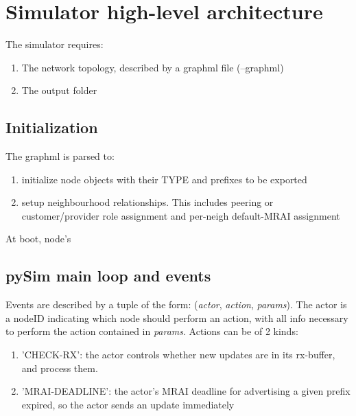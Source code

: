 \documentclass[fleqn,10pt]{SelfArx} %
\begin{document}
\flushbottom %
\maketitle %
\thispagestyle{empty} %

\section{Simulator high-level architecture} 
The simulator requires:
\begin{enumerate}[noitemsep]
  \item The network topology, described by a graphml file (\textsf{--graphml})
  \item The output folder
\end{enumerate}

\subsection*{Initialization}
The graphml is parsed to:
\begin{enumerate}[noitemsep]
  \item initialize node objects with their TYPE and prefixes to be exported
  \item setup neighbourhood relationships. This includes peering or customer/provider role assignment and per-neigh default-MRAI assignment
\end{enumerate}
At boot, node's 

\subsection*{pySim main loop and events}
Events are described by a tuple of the form: (\textit{actor}, \textit{action}, \textit{params}). The actor is a nodeID indicating which node should perform an action, with all info necessary to perform the action contained in \textit{params}. Actions can be of 2 kinds:

\begin{enumerate}[noitemsep]
 \item 'CHECK-RX': the actor controls whether new updates are in its rx-buffer, and process them.
 \item 'MRAI-DEADLINE': the actor's MRAI deadline for advertising a given prefix expired, so the actor sends an update immediately
\end{enumerate}
\end{document}
